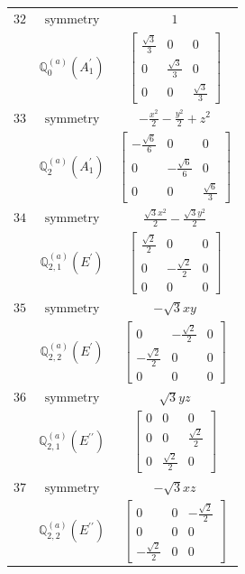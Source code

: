\documentclass[fleqn,8pt,landscape]{jsarticle}
\begin{document}
\begin{longtable}{ccc}
$ 32 $ & $ \text{symmetry} $ & $ 1 $ \\
$  $ & $ \mathbb{Q}_{0}^{(a)}(A_{1}^{\prime}) $ & $ \begin{bmatrix} \frac{\sqrt{3}}{3} & 0 & 0 \\ 0 & \frac{\sqrt{3}}{3} & 0 \\ 0 & 0 & \frac{\sqrt{3}}{3} \end{bmatrix} $ \\ \hline
$ 33 $ & $ \text{symmetry} $ & $ - \frac{x^{2}}{2} - \frac{y^{2}}{2} + z^{2} $ \\
$  $ & $ \mathbb{Q}_{2}^{(a)}(A_{1}^{\prime}) $ & $ \begin{bmatrix} - \frac{\sqrt{6}}{6} & 0 & 0 \\ 0 & - \frac{\sqrt{6}}{6} & 0 \\ 0 & 0 & \frac{\sqrt{6}}{3} \end{bmatrix} $ \\ \hline
$ 34 $ & $ \text{symmetry} $ & $ \frac{\sqrt{3} x^{2}}{2} - \frac{\sqrt{3} y^{2}}{2} $ \\
$  $ & $ \mathbb{Q}_{2,1}^{(a)}(E^{\prime}) $ & $ \begin{bmatrix} \frac{\sqrt{2}}{2} & 0 & 0 \\ 0 & - \frac{\sqrt{2}}{2} & 0 \\ 0 & 0 & 0 \end{bmatrix} $ \\ \hline
$ 35 $ & $ \text{symmetry} $ & $ - \sqrt{3} x y $ \\
$  $ & $ \mathbb{Q}_{2,2}^{(a)}(E^{\prime}) $ & $ \begin{bmatrix} 0 & - \frac{\sqrt{2}}{2} & 0 \\ - \frac{\sqrt{2}}{2} & 0 & 0 \\ 0 & 0 & 0 \end{bmatrix} $ \\ \hline
$ 36 $ & $ \text{symmetry} $ & $ \sqrt{3} y z $ \\
$  $ & $ \mathbb{Q}_{2,1}^{(a)}(E^{\prime\prime}) $ & $ \begin{bmatrix} 0 & 0 & 0 \\ 0 & 0 & \frac{\sqrt{2}}{2} \\ 0 & \frac{\sqrt{2}}{2} & 0 \end{bmatrix} $ \\ \hline
$ 37 $ & $ \text{symmetry} $ & $ - \sqrt{3} x z $ \\
$  $ & $ \mathbb{Q}_{2,2}^{(a)}(E^{\prime\prime}) $ & $ \begin{bmatrix} 0 & 0 & - \frac{\sqrt{2}}{2} \\ 0 & 0 & 0 \\ - \frac{\sqrt{2}}{2} & 0 & 0 \end{bmatrix} $ \\ \hline

\end{longtable}
\end{document}
